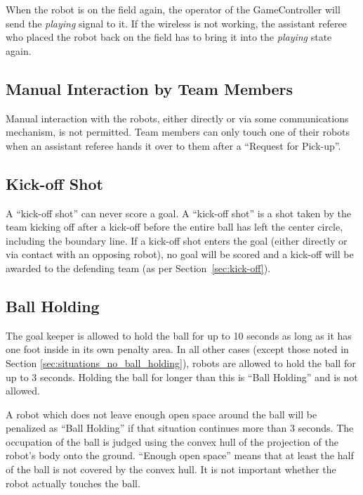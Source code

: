 \documentclass[12pt]{article}
\begin{document}
When the robot is on the field again, the operator of the GameController will send the \emph{playing} signal to it. If the wireless is not working, the assistant referee who placed the robot back on the field has to bring it into the \emph{playing} state again.

\subsection{Manual Interaction by Team Members}

Manual interaction with the robots, either directly or via some communications mechanism, is not permitted. Team members can only touch one of their robots when an assistant referee hands it over to them after a ``Request for Pick-up''.

\subsection{Kick-off Shot}
\label{sec:kick-off_shot}

A ``kick-off shot'' can never score a goal. A ``kick-off shot'' is a shot taken by the team kicking off after a kick-off before the entire ball has left the center circle, including the boundary line. 
If a kick-off shot enters the goal (either directly or via contact with an opposing robot), no goal will be scored and a kick-off will be awarded to the defending team (as per Section~\ref{sec:kick-off}).

\subsection{Ball Holding}
\label{sec:ball_holding}

The goal keeper is allowed to hold the ball for up to 10 seconds as long as it has one foot inside in its own penalty area.  In all other cases (except those noted in Section \ref{sec:situations_no_ball_holding}), robots are allowed to hold the ball for up to 3 seconds. Holding the ball for longer than this is ``Ball Holding'' and is not allowed.

A robot which does not leave enough open space around the ball will be penalized as ``Ball Holding'' if that situation continues more than 3 seconds. The occupation of the ball is judged using the convex hull of the projection of the robot's body onto the ground. ``Enough open space'' means that at least the half of the ball is not covered by the convex hull. It is not important whether the robot actually touches the ball.
\end{document}
